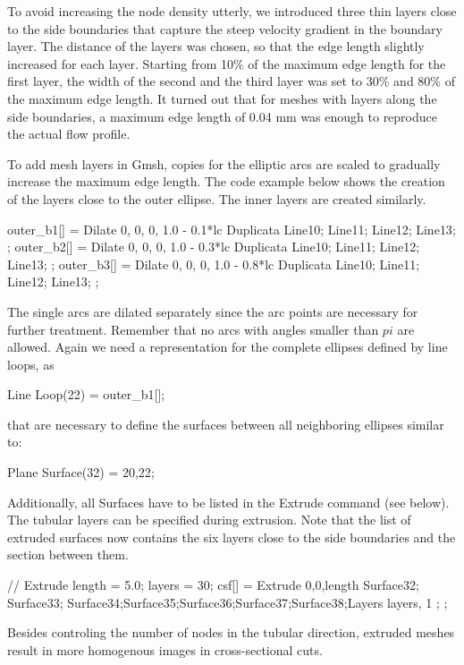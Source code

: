 To avoid increasing the node density utterly, we introduced three thin layers close to the side boundaries that capture the steep velocity gradient in the boundary layer. The distance of the layers was chosen, so that the edge length slightly increased for each layer. Starting from 10\% of the maximum edge length for the first layer, the width of the second and the third layer was set to 30\% and 80\% of the maximum edge length. It turned out that for meshes with layers along the side boundaries, a maximum edge length of 0.04 mm was enough to reproduce the actual flow profile.

To add mesh layers in Gmsh, copies for the elliptic arcs are scaled to gradually increase the maximum edge length. The code example below shows the creation of the layers close to the outer ellipse. The inner layers are created similarly.
\begin{code}
outer_b1[] = Dilate {{0, 0, 0}, 1.0 - 0.1*lc } {
Duplicata{  Line{10}; Line{11}; Line{12}; Line{13}; } };
outer_b2[] = Dilate {{0, 0, 0}, 1.0 - 0.3*lc } {
Duplicata{  Line{10}; Line{11}; Line{12}; Line{13}; } };
outer_b3[] = Dilate {{0, 0, 0}, 1.0 - 0.8*lc } {
Duplicata{  Line{10}; Line{11}; Line{12}; Line{13}; } };
\end{code}
The single arcs are dilated separately since the arc points are necessary for further treatment. Remember that no arcs with angles smaller than $pi$ are allowed. Again we need a representation for the complete ellipses defined by line loops, as
\begin{code}
Line Loop(22) = {outer_b1[]};
\end{code}
that are necessary to define the surfaces between all neighboring ellipses similar to:
\begin{code}
Plane Surface(32) = {20,22};
\end{code}
Additionally, all Surfaces have to be listed in the Extrude command (see below).\\


The tubular layers can be specified during extrusion. Note that the list of extruded surfaces now contains the six layers close to the side boundaries and the section between them.
\begin{code}
// Extrude
length = 5.0;
layers = 30;
csf[] = Extrude {0,0,length} {Surface{32}; Surface{33};
   Surface{34};Surface{35};Surface{36};Surface{37};Surface{38};Layers{ {layers}, {1} }; };
\end{code}
Besides controling the number of nodes in the tubular direction, extruded meshes result in more homogenous images in cross-sectional cuts.\\



